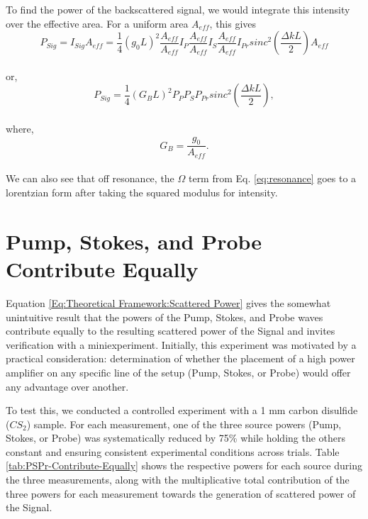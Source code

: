 \documentclass[%
  reprint,
  superscriptaddress,
  amsmath,amssymb,
  aps,
  prapplied,
]{revtex4-2}
\begin{document}
To find the power of the backscattered signal, we would integrate this intensity over the effective area. For a uniform area $A_{eff}$, this gives
\\
\begin{equation}
  P_{Sig} = I_{Sig}A_{eff} = \frac{1}{4}(g_{0}L)^{2}\frac{A_{eff}}{A_{eff}}I_{P}\frac{A_{eff}}{A_{eff}}I_{S}\frac{A_{eff}}{A_{eff}}I_{Pr}sinc^{2}\left(\frac{\Delta kL}{2}\right)A_{eff}
\end{equation}
\\
or,
\\
\begin{equation}
  P_{Sig} = \frac{1}{4}(G_{B}L)^{2}P_{P}P_{S}P_{Pr}sinc^{2}\left(\frac{\Delta kL}{2}\right),
\end{equation}
\\
where,
\\
\begin{equation}
  G_{B} = \frac{g_{0}}{A_{eff}}.
\end{equation}
\\
We can also see that off resonance, the $\Omega$ term from Eq. \ref{eq:resonance} goes to a lorentzian form after taking the squared modulus for intensity.

\newpage

\section{Pump, Stokes, and Probe Contribute Equally}

Equation \ref{Eq:Theoretical Framework:Scattered Power} gives the somewhat unintuitive result that the powers of the Pump, Stokes, and Probe waves contribute equally to the resulting scattered power of the Signal and invites verification with a miniexperiment. Initially, this experiment was motivated by a practical consideration: determination of whether the placement of a high power amplifier on any specific line of the setup (Pump, Stokes, or Probe) would offer any advantage over another.

To test this, we conducted a controlled experiment with a 1 mm carbon disulfide ($CS_{2}$) sample. For each measurement, one of the three source powers (Pump, Stokes, or Probe) was systematically reduced by 75\% while holding the others constant and ensuring consistent experimental conditions across trials. Table \ref{tab:PSPr-Contribute-Equally} shows the respective powers for each source during the three measurements, along with the multiplicative total contribution of the three powers for each measurement towards the generation of scattered power of the Signal.
\end{document}
